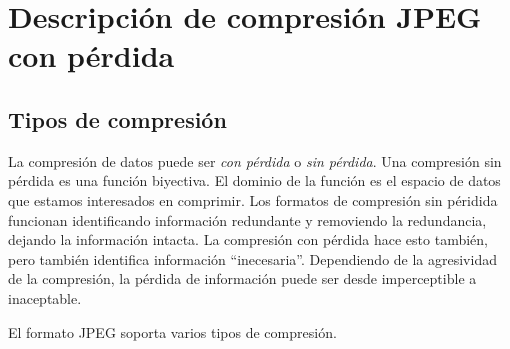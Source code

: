 \chapter{Descripción de compresión JPEG con pérdida}\label{ch:jpeg_desc}

\section{Tipos de compresión}

La compresión de datos puede ser \emph{con pérdida} o \emph{sin pérdida}. Una compresión sin pérdida es una función biyectiva. El dominio de la función es el espacio de datos que estamos interesados en comprimir. Los formatos de compresión sin péridida funcionan identificando información redundante y removiendo la redundancia, dejando la información intacta. La compresión con pérdida hace esto también, pero también identifica información ``inecesaria''. Dependiendo de la agresividad de la compresión, la pérdida de información puede ser desde imperceptible a inaceptable.

El formato JPEG soporta varios tipos de compresión.

